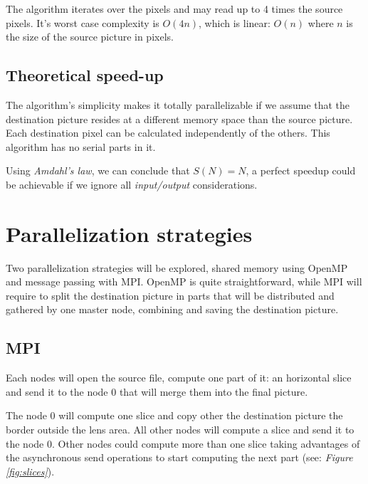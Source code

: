 \documentclass[10pt,a4paper]{article}
\begin{document}
The algorithm iterates over the pixels and may read up to 4 times the source
pixels. It's worst case complexity is $O(4n)$, which is linear: $O(n)$ where
$n$ is the size of the source picture in pixels.

\subsection{Theoretical speed-up}

The algorithm's simplicity makes it totally parallelizable if we assume that
the destination picture resides at a different memory space than the source
picture. Each destination pixel can be calculated independently of the others.
This algorithm has no serial parts in it.

Using \emph{Amdahl's law}, we can conclude that $S(N) = N$, a perfect speedup
could be achievable if we ignore all \emph{input/output} considerations.

\section{Parallelization strategies}
Two parallelization strategies will be explored, shared memory using OpenMP and
message passing with MPI. OpenMP is quite straightforward, while MPI will
require to split the destination picture in parts that will be distributed and
gathered by one master node, combining and saving the destination picture.

\subsection{MPI}
Each nodes will open the source file, compute one part of it: an horizontal
slice and send it to the node $0$ that will merge them into the final picture.

The node $0$ will compute one slice and copy other the destination picture the
border outside the lens area. All other nodes will compute a slice and send it
to the node $0$. Other nodes could compute more than one slice taking
advantages of the asynchronous send operations to start computing the next
part (see: \emph{Figure \ref{fig:slices}}).
\end{document}
